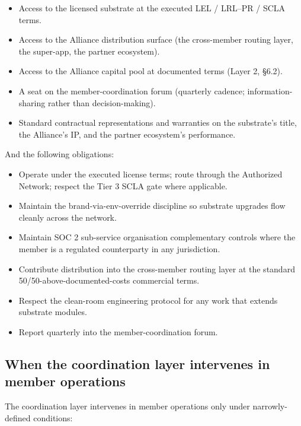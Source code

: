 \begin{itemize}[leftmargin=2em,itemsep=0.1em]
\item Access to the licensed substrate at the executed LEL / LRL--PR /
SCLA terms.
\item Access to the Alliance distribution surface (the cross-member
routing layer, the super-app, the partner ecosystem).
\item Access to the Alliance capital pool at documented terms (Layer 2,
\S 6.2).
\item A seat on the member-coordination forum (quarterly cadence;
information-sharing rather than decision-making).
\item Standard contractual representations and warranties on the
substrate's title, the Alliance's IP, and the partner ecosystem's
performance.
\end{itemize}

And the following obligations:

\begin{itemize}[leftmargin=2em,itemsep=0.1em]
\item Operate under the executed license terms; route through the
Authorized Network; respect the Tier 3 SCLA gate where applicable.
\item Maintain the brand-via-env-override discipline so substrate
upgrades flow cleanly across the network.
\item Maintain SOC 2 sub-service organisation complementary controls
where the member is a regulated counterparty in any jurisdiction.
\item Contribute distribution into the cross-member routing layer at
the standard 50/50-above-documented-costs commercial terms.
\item Respect the clean-room engineering protocol for any work that
extends substrate modules.
\item Report quarterly into the member-coordination forum.
\end{itemize}

\subsection{When the coordination layer intervenes in member operations}

The coordination layer intervenes in member operations only under
narrowly-defined conditions:

